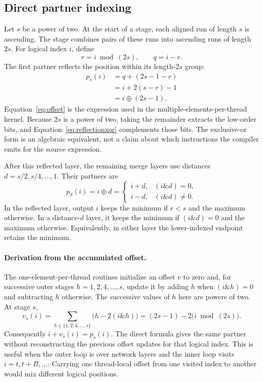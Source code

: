 \documentclass[fleqn,10pt,lineno]{wlpeerj}
\newcommand{\xor}{\mathbin{\oplus}}
\newcommand{\band}{\mathbin{\&}}
\begin{document}
\subsection*{Direct partner indexing}
\label{sec:indexing}
Let $s$ be a power of two. At the start of a stage, each aligned run of length $s$ is ascending. The stage combines pairs of these runs into ascending runs of length $2s$. For logical index $i$, define
\begin{equation}
 r=i\bmod(2s),\qquad q=i-r.
\end{equation}
The first partner reflects the position within its length-$2s$ group:
\begin{align}
 p_s(i)&=q+(2s-1-r)\label{eq:reflection}\\
       &=i+2(s-r)-1\label{eq:offset}\\
       &=i\xor(2s-1).\label{eq:reflectionxor}
\end{align}
Equation~\ref{eq:offset} is the expression used in the multiple-elements-per-thread kernel. Because $2s$ is a power of two, taking the remainder extracts the low-order bits, and Equation~\ref{eq:reflectionxor} complements those bits. The exclusive-or form is an algebraic equivalent, not a claim about which instructions the compiler emits for the source expression.

After this reflected layer, the remaining merge layers use distances $d=s/2,s/4,\ldots,1$. Their partners are
\begin{equation}
 p_d(i)=i\xor d
 =\begin{cases}i+d,&(i\band d)=0,\\i-d,&(i\band d)\ne0.\end{cases}
\label{eq:xor}
\end{equation}
In the reflected layer, output $i$ keeps the minimum if $r<s$ and the maximum otherwise. In a distance-$d$ layer, it keeps the minimum if $(i\band d)=0$ and the maximum otherwise. Equivalently, in either layer the lower-indexed endpoint retains the minimum.

\paragraph{Derivation from the accumulated offset.}
The one-element-per-thread routines initialize an offset $v$ to zero and, for successive outer stages $h=1,2,4,\ldots,s$, update it by adding $h$ when $(i\band h)=0$ and subtracting $h$ otherwise. The successive values of $h$ here are powers of two. At stage $s$,
\begin{equation}
 v_s(i)=\sum_{h\in\{1,2,4,\ldots,s\}}\bigl(h-2(i\band h)\bigr)
       =(2s-1)-2\bigl(i\bmod(2s)\bigr).
\label{eq:recurrence}
\end{equation}
Consequently $i+v_s(i)=p_s(i)$. The direct formula gives the same partner without reconstructing the previous offset updates for that logical index. This is useful when the outer loop is over network layers and the inner loop visits $i=t,t+B,\ldots$. Carrying one thread-local offset from one visited index to another would mix different logical positions.
\end{document}
